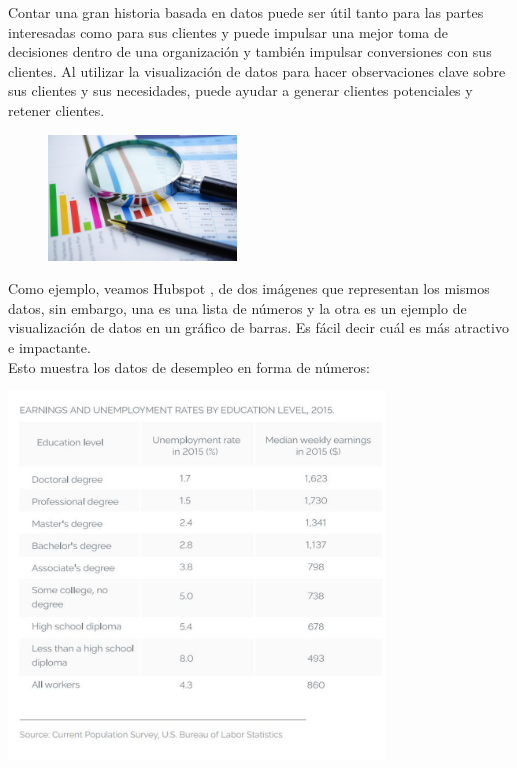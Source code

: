 \documentclass[preprint,12pt]{elsarticle}
\begin{document}
Contar una gran historia basada en datos puede ser útil tanto para las partes interesadas como para sus clientes y puede impulsar una mejor toma de decisiones dentro de una organización y también impulsar conversiones con sus clientes. Al utilizar la visualización de datos para hacer observaciones clave sobre sus clientes y sus necesidades, puede ayudar a generar clientes potenciales y retener clientes.\\

			\begin{figure}[htb]
				\begin{center}
					\includegraphics[width=5cm]{./Imagenes/ejemplo}
				\end{center}
			\end{figure}

Como ejemplo, veamos Hubspot , de dos imágenes que representan los mismos datos, sin embargo, una es una lista de números y la otra es un ejemplo de visualización de datos en un gráfico de barras. Es fácil decir cuál es más atractivo e impactante.\\

Esto muestra los datos de desempleo en forma de números:\\

	\begin{center}
		\includegraphics[width=10cm]{./Imagenes/ejemplo2}
	\end{center}
\end{document}
